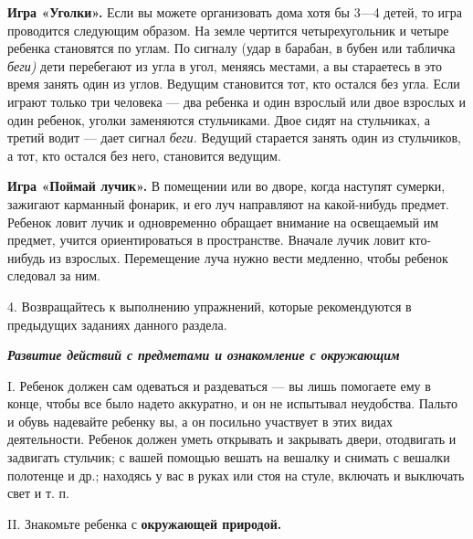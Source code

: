 \documentclass{book}
\renewcommand{\emph}[1]{\textit{#1}}
\begin{document}
\textbf{Игра «Уголки».} Если вы можете организовать дома хотя бы 3---4
детей, то игра проводится следующим образом. На земле чертится
четырехугольник и четыре ребенка становятся по углам. По сигналу (удар в
барабан, в бубен или табличка \emph{беги)} дети перебегают из угла в
угол, меняясь местами, а вы стараетесь в это время занять один из углов.
Ведущим становится тот, кто остался без угла. Если играют только три
человека --- два ребенка и один взрослый или двое взрослых и один
ребенок, уголки заменяются стульчиками. Двое сидят на стульчиках, а
третий водит --- дает сигнал \emph{беги.} Ведущий старается занять один
из стульчиков, а тот, кто остался без него, становится ведущим.

\textbf{Игра «Поймай лучик».} В помещении или во дворе, когда наступят
сумерки, зажигают карманный фонарик, и его луч направляют на
какой-нибудь предмет. Ребенок ловит лучик и одновременно обращает
внимание на освещаемый им предмет, учится ориентироваться в
пространстве. Вначале лучик ловит кто-нибудь из взрослых. Перемещение
луча нужно вести медленно, чтобы ребенок следовал за ним.

4. Возвращайтесь к выполнению упражнений, которые рекомендуются в
предыдущих заданиях данного раздела.

\emph{\textbf{Развитие действий с предметами и ознакомление с
окружающим}}

I. Ребенок должен сам одеваться и раздеваться --- вы лишь помогаете ему
в конце, чтобы все было надето аккуратно, и он не испытывал неудобства.
Пальто и обувь надевайте ребенку вы, а он посильно участвует в этих
видах деятельности. Ребенок должен уметь открывать и закрывать двери,
отодвигать и задвигать стульчик; с вашей помощью вешать на вешалку и
снимать с вешалки полотенце и др.; находясь у вас в руках или стоя на
стуле, включать и выключать свет и т. п.

II. Знакомьте ребенка с \textbf{окружающей природой.}
\end{document}
